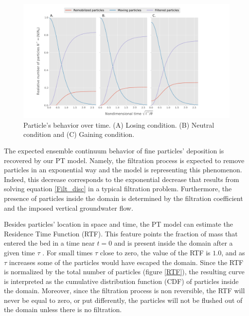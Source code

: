 \documentclass[draft,linenumbers]{agujournal2018}
\begin{document}
\begin{figure}
\centering
\includegraphics[trim=0.2cm 0.2cm 0.2cm 0.2cm, width=60pc]
{190131_Pvst.pdf}
\caption{Particle's behavior over time. (A) Losing condition. (B) Neutral condition and (C) Gaining condition.}
\label{Pvst}
\end{figure}

The expected ensemble continuum behavior of fine particles' deposition is recovered by our PT model. Namely, the filtration process is expected to remove particles in an exponential way and the model is representing this phenomenon. Indeed, this decrease corresponds to the exponential decrease that results from solving equation \ref{Filt_disc} in a typical filtration problem. Furthermore, the presence of particles inside the domain is determined by the filtration coefficient and the imposed vertical groundwater flow.  

Besides particles' location in space and time, the PT model can estimate the Residence Time Function (RTF). This feature points the fraction of mass that entered the bed in a time near $t = 0$ and is present inside the domain after a given time $\tau$ \citep{Elliott1997,Packman2000}. For small times $\tau$ close to zero, the value of the RTF is $1.0$, and as $\tau$ increases some of the particles would have escaped the domain. Since the RTF is normalized by the total number of particles (figure \ref{RTF}), the resulting curve is interpreted as the cumulative distribution function (CDF) of particles inside the domain. Moreover, since the filtration process is non reversible, the RTF will never be equal to zero, or put differently, the particles will not be flushed out of the domain unless there is no filtration.
\end{document}
